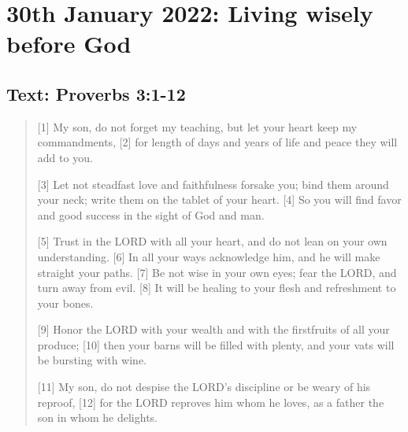 \section{30th January 2022: Living wisely before God}
\subsection*{Text: Proverbs 3:1-12}
\begin{quote}
  [1] My son, do not forget my teaching,
        but let your heart keep my commandments,
  [2] for length of days and years of life
      and peace they will add to you.


  [3] Let not steadfast love and faithfulness forsake you;
      bind them around your neck;
      write them on the tablet of your heart.
  [4] So you will find favor and good success
      in the sight of God and man.


  [5] Trust in the LORD with all your heart,
      and do not lean on your own understanding.
  [6] In all your ways acknowledge him,
      and he will make straight your paths.
  [7] Be not wise in your own eyes;
      fear the LORD, and turn away from evil.
  [8] It will be healing to your flesh
      and refreshment to your bones.


  [9] Honor the LORD with your wealth
      and with the firstfruits of all your produce;
  [10] then your barns will be filled with plenty,
      and your vats will be bursting with wine.


  [11] My son, do not despise the LORD’s discipline
      or be weary of his reproof,
  [12] for the LORD reproves him whom he loves,
      as a father the son in whom he delights.
\end{quote}
